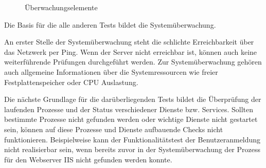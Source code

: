 \begin{figure}[ht]
	\centering
		\caption{Überwachungselemente}
		\label{moniele}
\end{figure}


Die Basis für die alle anderen Tests bildet die Systemüberwachung.

An erster Stelle der Systemüberwachung steht die schlichte Erreichbarkeit über das Netzwerk per Ping.
Wenn der Server nicht erreichbar ist, können auch keine weiterführende Prüfungen durchgeführt werden.
Zur Systemüberwachung gehören auch allgemeine Informationen über die Systemressourcen wie freier Festplattenspeicher oder CPU Auslastung.

Die nächste Grundlage für die darüberliegenden Tests bildet die Überprüfung der laufenden Prozesse und der Status verschiedener Dienste bzw. Services.
Sollten bestimmte Prozesse nicht gefunden werden oder wichtige Dienste nicht gestartet sein, können auf diese Prozesse und Dienste aufbauende Checks nicht funktionieren.
Beispielweise kann der Funktionalitätstest der Benutzeranmeldung nicht realisierbar sein, wenn bereits zuvor in der Systemüberwachung der Prozess für den Webserver IIS nicht gefunden werden konnte.













